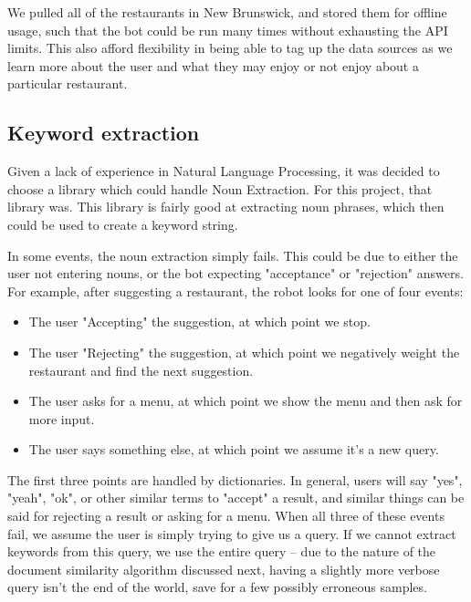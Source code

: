 \documentclass{article}
\begin{document}
        We pulled all of the restaurants in New Brunswick, and stored them for offline usage, such that the bot could be run many times without exhausting the 
API limits. This also afford flexibility in being able to tag up the data sources as we learn more about the user and what they may enjoy or not enjoy about a 
particular restaurant.
        
    \subsection{Keyword extraction}
        Given a lack of experience in Natural Language Processing, it was decided to choose a library which could handle Noun Extraction. For this project, that 
library was. This library is fairly good at extracting noun phrases, which then could be used to create a keyword string.
        
        In some events, the noun extraction simply fails. This could be due to either the user not entering nouns, or the bot expecting "acceptance" or 
"rejection" answers. For example, after suggesting a restaurant, the robot looks for one of four events:
        
        \begin{itemize}
            \item The user "Accepting" the suggestion, at which point we stop.
            \item The user "Rejecting" the suggestion, at which point we negatively weight the restaurant and find the next suggestion.
            \item The user asks for a menu, at which point we show the menu and then ask for more input.
            \item The user says something else, at which point we assume it's a new query.
        \end{itemize}
        
        The first three points are handled by dictionaries. In general, users will say "yes", "yeah", "ok", or other similar terms to "accept" a result, and 
similar things can be said for rejecting a result or asking for a menu. When all three of these events fail, we assume the user is simply trying to give us a 
query. If we cannot extract keywords from this query, we use the entire query -- due to the nature of the document similarity algorithm discussed next, having a 
slightly more verbose query isn't the end of the world, save for a few possibly erroneous samples.
        
\end{document}
